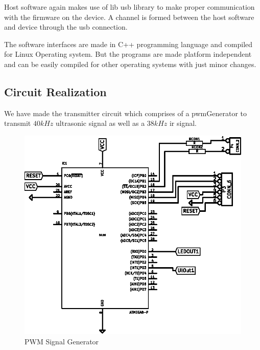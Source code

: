 Host software again makes use of lib \gls{usb} library to make proper communication with the firmware on the device. A channel is formed between the host software and device through the \gls{usb} connection.


The software interfaces are made in C++ programming language and compiled for Linux Operating system. But the programs are made platform independent and can be easily compiled for other operating systems with just minor changes.


\subsection{Circuit Realization}
We have made the transmitter circuit which comprises of a \gls{pwm}Generator to transmit $40kHz$ ultrasonic signal as well as a $38kHz$ \gls{ir} signal.

\begin{figure}
	\centering
	\includegraphics{Images/PWMGenerator.eps}
	\caption{PWM Signal Generator}
	\label{fig:PWMGenerator}
\end{figure}

